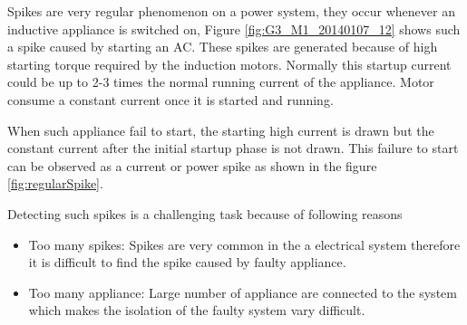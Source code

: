 
Spikes are very regular phenomenon on a power system, they occur whenever an inductive  appliance is switched on, Figure \ref{fig:G3_M1_20140107_12} shows such a spike caused by starting an AC. These spikes are generated because of high starting torque required by the induction motors. Normally this startup current could be up to 2-3 times the normal running current of the appliance. Motor consume a constant current once it is started and running.  

When such appliance fail to start, the starting high current is drawn but the constant current after the initial startup phase is not drawn. This failure to start can be observed as a current or power spike as shown in the figure \ref{fig:regularSpike}. 

Detecting such spikes is a challenging task because of following reasons 
\begin{itemize}
	\item Too many spikes: Spikes are very common in the a electrical system therefore it is difficult to find the spike caused by faulty appliance.
	\item Too many appliance: Large number of appliance are connected to the system which makes the isolation of the faulty system vary difficult.
\end{itemize}

